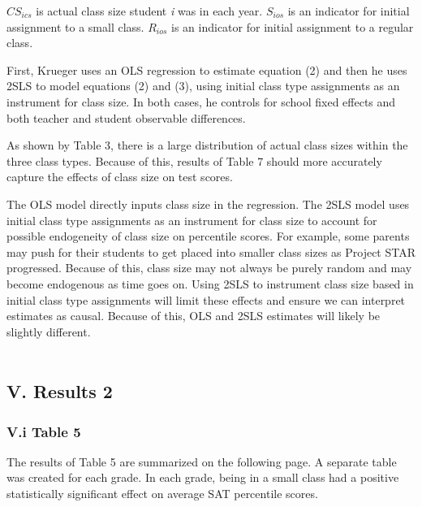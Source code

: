 \documentclass[a4paper,11pt]{article}
\begin{document}
$CS_{ics}$ is actual class size student \textit{i} was in each year. $S_{ios}$ is an indicator for initial assignment to a small class. $R_{ios}$ is an indicator for initial assignment to a regular class.  \par

First, Krueger uses an OLS regression to estimate equation (2) and then he uses 2SLS to model equations (2) and (3), using initial class type assignments as an instrument for class size. In both cases, he controls for school fixed effects and both teacher and student observable differences. \par 

As shown by Table 3, there is a large distribution of actual class sizes within the three class types. Because of this, results of Table 7 should more accurately capture the effects of class size on test scores. \par

The OLS model directly inputs class size in the regression. The 2SLS model uses initial class type assignments as an instrument for class size to account for possible endogeneity of class size on percentile scores. For example, some parents may push for their students to get placed into smaller class sizes as Project STAR progressed. Because of this, class size may not always be purely random and may become endogenous as time goes on. Using 2SLS to instrument class size based in initial class type assignments will limit these effects and ensure we can interpret estimates as causal. Because of this, OLS and 2SLS estimates will likely be slightly different. \\ \\  	

\subsection*{V. Results 2}

\subsubsection*{V.i Table 5}
The results of Table 5 are summarized on the following page. A separate table was created for each grade. In each grade, being in a small class had a positive statistically significant effect on average SAT percentile scores.\par
\end{document}
